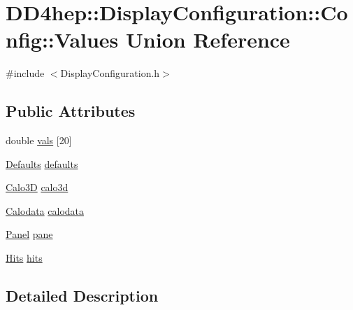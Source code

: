 \hypertarget{union_d_d4hep_1_1_display_configuration_1_1_config_1_1_values}{}\section{D\+D4hep\+:\+:Display\+Configuration\+:\+:Config\+:\+:Values Union Reference}
\label{union_d_d4hep_1_1_display_configuration_1_1_config_1_1_values}


{\ttfamily \#include $<$Display\+Configuration.\+h$>$}

\subsection*{Public Attributes}
\begin{DoxyCompactItemize}
\item 
double \hyperlink{union_d_d4hep_1_1_display_configuration_1_1_config_1_1_values_aba0dbc907603e0decb003ec889e684b9}{vals} \mbox{[}20\mbox{]}
\item 
\hyperlink{struct_d_d4hep_1_1_display_configuration_1_1_defaults}{Defaults} \hyperlink{union_d_d4hep_1_1_display_configuration_1_1_config_1_1_values_af0a8cde0c8737c87ee05d38de1f93505}{defaults}
\item 
\hyperlink{struct_d_d4hep_1_1_display_configuration_1_1_calo3_d}{Calo3D} \hyperlink{union_d_d4hep_1_1_display_configuration_1_1_config_1_1_values_adbed006d75dc86cab0e4774c82e4be48}{calo3d}
\item 
\hyperlink{struct_d_d4hep_1_1_display_configuration_1_1_calodata}{Calodata} \hyperlink{union_d_d4hep_1_1_display_configuration_1_1_config_1_1_values_ad20f453699ee7904ed8b510fa714b184}{calodata}
\item 
\hyperlink{struct_d_d4hep_1_1_display_configuration_1_1_panel}{Panel} \hyperlink{union_d_d4hep_1_1_display_configuration_1_1_config_1_1_values_af61c2a6b0a332acd9edf8e8387e8fd0c}{pane}
\item 
\hyperlink{struct_d_d4hep_1_1_display_configuration_1_1_hits}{Hits} \hyperlink{union_d_d4hep_1_1_display_configuration_1_1_config_1_1_values_ab649c49cff98283b0349025bb35e329a}{hits}
\end{DoxyCompactItemize}


\subsection{Detailed Description}


